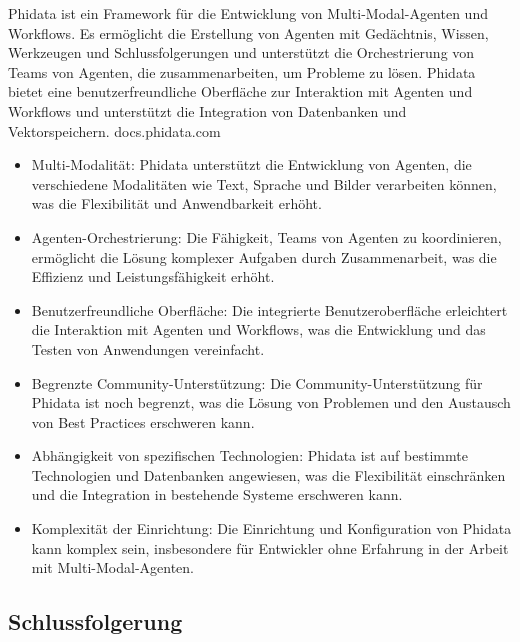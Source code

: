 Phidata ist ein Framework für die Entwicklung von Multi-Modal-Agenten und Workflows. Es ermöglicht die Erstellung von Agenten mit Gedächtnis, Wissen, Werkzeugen und Schlussfolgerungen und unterstützt die Orchestrierung von Teams von Agenten, die zusammenarbeiten, um Probleme zu lösen. Phidata bietet eine benutzerfreundliche Oberfläche zur Interaktion mit Agenten und Workflows und unterstützt die Integration von Datenbanken und Vektorspeichern.
docs.phidata.com

\begin{itemize}
    \item Multi-Modalität: Phidata unterstützt die Entwicklung von Agenten, die verschiedene Modalitäten wie Text, Sprache und Bilder verarbeiten können, was die Flexibilität und Anwendbarkeit erhöht.

    \item Agenten-Orchestrierung: Die Fähigkeit, Teams von Agenten zu koordinieren, ermöglicht die Lösung komplexer Aufgaben durch Zusammenarbeit, was die Effizienz und Leistungsfähigkeit erhöht.

    \item Benutzerfreundliche Oberfläche: Die integrierte Benutzeroberfläche erleichtert die Interaktion mit Agenten und Workflows, was die Entwicklung und das Testen von Anwendungen vereinfacht.
\end{itemize}

\begin{itemize}
    \item Begrenzte Community-Unterstützung: Die Community-Unterstützung für Phidata ist noch begrenzt, was die Lösung von Problemen und den Austausch von Best Practices erschweren kann.

    \item Abhängigkeit von spezifischen Technologien: Phidata ist auf bestimmte Technologien und Datenbanken angewiesen, was die Flexibilität einschränken und die Integration in bestehende Systeme erschweren kann.

    \item Komplexität der Einrichtung: Die Einrichtung und Konfiguration von Phidata kann komplex sein, insbesondere für Entwickler ohne Erfahrung in der Arbeit mit Multi-Modal-Agenten.
\end{itemize}

\subsection{Schlussfolgerung}

